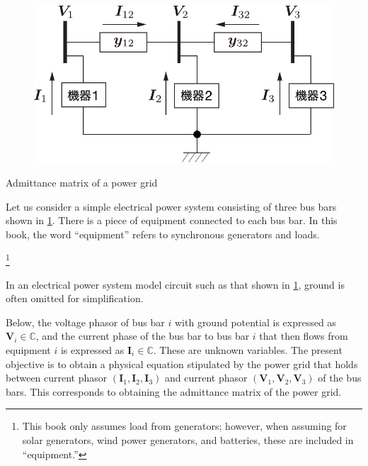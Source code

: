 \documentclass[graybox, envcountchap]{svmult}
\begin{document}
\begin{figure}[t]
\centering
\includegraphics[width = .60\linewidth]{figs/3busex}
\medskip
\caption{\textbf{}}
\label{fig:3busex}
\medskip
\end{figure}

\begin{example}{Admittance matrix of a power grid}\label{ex:derY}

Let us consider a simple electrical power system consisting of three bus bars
shown in \ref{fig:3busex}.  There is a piece of equipment connected to each bus
bar.  In this book, the word “equipment” refers to synchronous generators and
loads.

\footnote{ This book only assumes load from generators; however, when assuming
for solar generators, wind power generators, and batteries, these are included
in “equipment.” }

In an electrical power system model circuit such as that shown in
\ref{fig:3busex}, ground is often omitted for simplification.

Below, the voltage phasor of bus bar $i$ with ground potential is expressed as $\bm{V}_i \in \mathbb{C}$, 
and the current phase of the bus bar to bus bar $i$ that then flows from equipment $i$ is expressed as $\bm{I}_i \in \mathbb{C}$. 
These are unknown variables. The present objective is to obtain a physical equation stipulated by the power grid that holds between current phasor $(\bm{I}_1,\bm{I}_2,\bm{I}_3)$ and current phasor $(\bm{V}_1,\bm{V}_2,\bm{V}_3)$ of the bus bars. 
This corresponds to obtaining the admittance matrix of the power grid.



\end{example}
\end{document}
